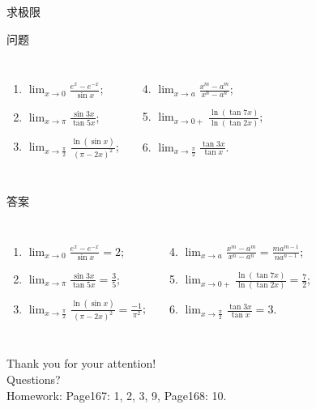 \documentclass[
10pt,
aspectratio=43,
]{beamer}
\begin{document}
\begin{frame}[fragile]{求极限} 
	\begin{block}{问题}
		\begin{columns}[onlytextwidth]
		\begin{enumerate} 
			\item $\displaystyle\lim _{x \rightarrow 0} \frac{e^x-e^{-x}}{\sin x}$; 
			\item $\displaystyle\lim _{x \rightarrow \pi } \frac{\sin 3 x}{\tan 5 x}$; 
			\item $\displaystyle\lim _{x \rightarrow \frac{\pi}{2}} \frac{\ln (\sin x)}{(\pi-2 x)^2}$; 
		\end{enumerate} 
			\begin{enumerate} \setcounter{enumi}{3}
			\item $\displaystyle\lim _{x \rightarrow a} \frac{x^m-a^m}{x^n-a^n}$; 
			\item $\displaystyle\lim _{x \rightarrow 0+} \frac{\ln (\tan 7 x)}{\ln (\tan 2 x)}$; 
			\item $\displaystyle\lim _{x \rightarrow \frac{\pi}{2}} \frac{\tan 3 x}{\tan x}$. 
		\end{enumerate} 
	\end{columns}
		\end{block}

	\pause
	
	\begin{exampleblock}{答案} 
		\begin{columns}[onlytextwidth]
		\begin{enumerate} 
			\item $\displaystyle\lim _{x \rightarrow 0} \frac{e^x-e^{-x}}{\sin x} = 2$; \pause 
			\item $\displaystyle\lim _{x \rightarrow \pi } \frac{\sin 3 x}{\tan 5 x} = \frac{3}{5}$; \pause 
			\item $\displaystyle\lim _{x \rightarrow \frac{\pi}{2}} \frac{\ln (\sin x)}{(\pi-2 x)^2} = \frac{-1}{\pi^2}$; \pause 
		\end{enumerate} 
		\begin{enumerate} \setcounter{enumi}{3}
			\item $\displaystyle\lim _{x \rightarrow a} \frac{x^m-a^m}{x^n-a^n} = \frac{m a^{m-1}}{n a^{n-1}}$; \pause 
			\item $\displaystyle\lim _{x \rightarrow 0+} \frac{\ln (\tan 7 x)}{\ln (\tan 2 x)} = \frac{7}{2}$; \pause 
			\item $\displaystyle\lim _{x \rightarrow \frac{\pi}{2}} \frac{\tan 3 x}{\tan x} = 3.$ 
		\end{enumerate} 
	\end{columns}
	\end{exampleblock}
\end{frame}


\begin{frame}[plain]
	\vfill
	\centering
	{
	\centering \Huge \color{white} Thank you for your attention!\\[10pt]Questions?\\ [10pt] Homework: Page167: 1, 2, 3, 9, Page168: 10.
	}
	\vfill
\end{frame}
\end{document}
